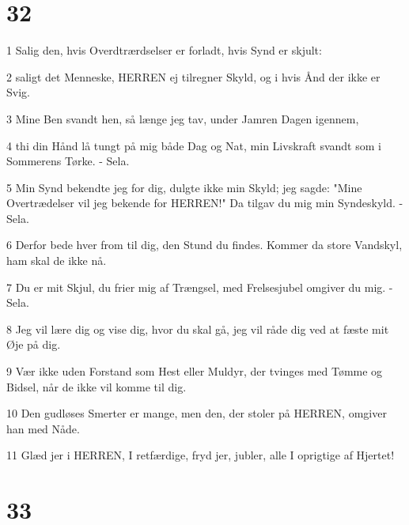 \chapter{32}

\par 1 Salig den, hvis Overdtrærdselser er forladt, hvis Synd er skjult:
\par 2 saligt det Menneske, HERREN ej tilregner Skyld, og i hvis Ånd der ikke er Svig.
\par 3 Mine Ben svandt hen, så længe jeg tav, under Jamren Dagen igennem,
\par 4 thi din Hånd lå tungt på mig både Dag og Nat, min Livskraft svandt som i Sommerens Tørke. - Sela.
\par 5 Min Synd bekendte jeg for dig, dulgte ikke min Skyld; jeg sagde: "Mine Overtrædelser vil jeg bekende for HERREN!" Da tilgav du mig min Syndeskyld. - Sela.
\par 6 Derfor bede hver from til dig, den Stund du findes. Kommer da store Vandskyl, ham skal de ikke nå.
\par 7 Du er mit Skjul, du frier mig af Trængsel, med Frelsesjubel omgiver du mig. - Sela.
\par 8 Jeg vil lære dig og vise dig, hvor du skal gå, jeg vil råde dig ved at fæste mit Øje på dig.
\par 9 Vær ikke uden Forstand som Hest eller Muldyr, der tvinges med Tømme og Bidsel, når de ikke vil komme til dig.
\par 10 Den gudløses Smerter er mange, men den, der stoler på HERREN, omgiver han med Nåde.
\par 11 Glæd jer i HERREN, I retfærdige, fryd jer, jubler, alle I oprigtige af Hjertet!

\chapter{33}

